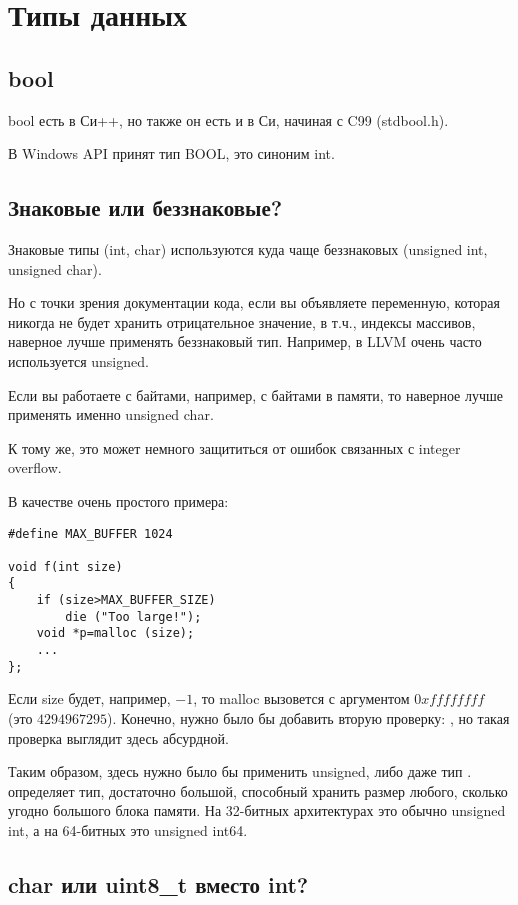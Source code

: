 ﻿\section{Типы данных}

\subsection{bool}

bool есть в Си++, но также он есть и в Си, начиная с C99 (stdbool.h).

В Windows API принят тип BOOL, это синоним int.

\subsection{Знаковые или беззнаковые?}

Знаковые типы (int, char) используются куда чаще беззнаковых (unsigned int, unsigned char).

Но с точки зрения документации кода, если вы объявляете переменную, которая никогда не будет хранить отрицательное
значение, в т.ч., индексы массивов, наверное лучше применять беззнаковый тип.
Например, в LLVM очень часто используется unsigned.

Если вы работаете с байтами, например, с байтами в памяти, то наверное лучше применять именно unsigned char.

К тому же, это может немного защититься от ошибок связанных с integer overflow\cite{Phrack3C0A}.

В качестве очень простого примера:

\begin{lstlisting}
#define MAX_BUFFER 1024

void f(int size)
{
	if (size>MAX_BUFFER_SIZE)
		die ("Too large!");
	void *p=malloc (size);
	...
};
\end{lstlisting}

Если size будет, например, $-1$, то malloc вызовется с аргументом $0xffffffff$ (это $4294967295$).
Конечно, нужно было бы добавить вторую проверку: , но такая проверка выглядит здесь абсурдной.

Таким образом, здесь нужно было бы применить unsigned, либо даже тип . 
 определяет тип, достаточно большой,
способный хранить размер любого, сколько угодно большого блока памяти.
На 32-битных архитектурах это обычно unsigned int,
а на 64-битных это unsigned int64.

\subsection{char или uint8\_t вместо int?}

